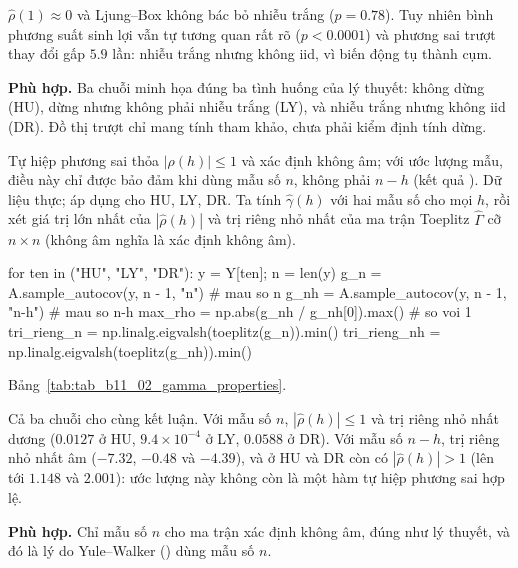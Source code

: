  $\hat\rho(1)\approx0$ và Ljung--Box không bác bỏ nhiễu trắng ($p=0.78$). Tuy nhiên bình phương suất sinh lợi vẫn tự tương quan rất rõ ($p<0.0001$) và phương sai trượt thay đổi gấp $5.9$ lần: nhiễu trắng nhưng không iid, vì biến động tụ thành cụm.

 \textbf{Phù hợp.} Ba chuỗi minh họa đúng ba tình huống của lý thuyết: không dừng (HU), dừng nhưng không phải nhiễu trắng (LY), và nhiễu trắng nhưng không iid (DR). Đồ thị trượt chỉ mang tính tham khảo, chưa phải kiểm định tính dừng.

 Tự hiệp phương sai thỏa $|\rho(h)|\le1$ và xác định không âm; với ước lượng mẫu, điều này chỉ được bảo đảm khi dùng mẫu số $n$, không phải $n-h$ (kết quả ).
 Dữ liệu thực; áp dụng cho HU, LY, DR. Ta tính $\hat\gamma(h)$ với hai mẫu số cho mọi $h$, rồi xét giá trị lớn nhất của $|\hat\rho(h)|$ và trị riêng nhỏ nhất của ma trận Toeplitz $\hat\Gamma$ cỡ $n\times n$ (không âm nghĩa là xác định không âm).
\begin{codeblock}
for ten in ("HU", "LY", "DR"):
    y = Y[ten]; n = len(y)
    g_n = A.sample_autocov(y, n - 1, "n")          # mau so n
    g_nh = A.sample_autocov(y, n - 1, "n-h")       # mau so n-h
    max_rho = np.abs(g_nh / g_nh[0]).max()         # so voi 1
    tri_rieng_n = np.linalg.eigvalsh(toeplitz(g_n)).min()
    tri_rieng_nh = np.linalg.eigvalsh(toeplitz(g_nh)).min()
\end{codeblock}
 Bảng~\ref{tab:tab_b11_02_gamma_properties}.

 Cả ba chuỗi cho cùng kết luận. Với mẫu số $n$, $|\hat\rho(h)|\le1$ và trị riêng nhỏ nhất dương ($0.0127$ ở HU, $9.4\times10^{-4}$ ở LY, $0.0588$ ở DR). Với mẫu số $n-h$, trị riêng nhỏ nhất âm ($-7.32$, $-0.48$ và $-4.39$), và ở HU và DR còn có $|\hat\rho(h)|>1$ (lên tới $1.148$ và $2.001$): ước lượng này không còn là một hàm tự hiệp phương sai hợp lệ.

 \textbf{Phù hợp.} Chỉ mẫu số $n$ cho ma trận xác định không âm, đúng như lý thuyết, và đó là lý do Yule--Walker () dùng mẫu số $n$.

